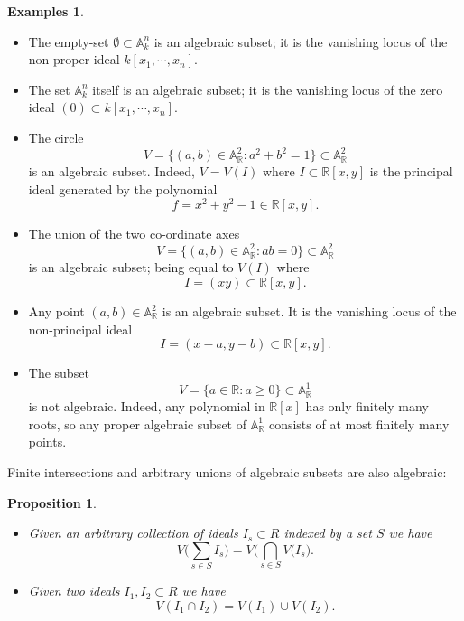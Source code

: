 \documentclass [12pt,oneside,a4paper,mathscr]{amsart}
\newtheorem{prop}[thm]{Proposition}
\theoremstyle{definition}
\newtheorem{examples}[thm]{Examples}
\newcommand {\A}{\mathbb A}
\renewcommand{\geq}{\geqslant}
\newcommand{\R}{\mathbb{R}}
\begin{document}
\begin{examples}
\label{eg_algset}
\begin{itemize}
\item[(a)] The empty-set $\emptyset\subset \A^n_k$ is an algebraic subset; it is the vanishing locus of the non-proper ideal $k[x_1,\cdots,x_n]$.\smallskip

\item[(b)]  The set $\A^n_k$ itself is an algebraic subset; it is the vanishing locus of the zero ideal $(0)\subset k[x_1,\cdots,x_n]$.
\smallskip
\item[(b)] The circle \[V=\{(a,b)\in \A^2_\R:a^2+b^2=1\}\subset \A^2_\R\] is an algebraic subset. Indeed, $V=V(I)$ where $I\subset \R[x,y]$ is the principal ideal generated by the polynomial \[f=x^2+y^2-1\in \R[x,y].\]
\item[(c)] The union of the two co-ordinate axes
\[V=\{(a,b)\in \A^2_\R:ab=0\}\subset \A^2_\R\] is an algebraic subset; being equal to $V(I)$ where \[I=(xy)\subset \R[x,y].\]
\item[(d)] Any  point $(a,b)\in \A^2_\R$ is an algebraic subset. It is the vanishing locus of the non-principal ideal \[I=(x-a,y-b)\subset \R[x,y].\]
\item[(e)] The subset \[V=\{a\in \R: a\geq 0\}\subset \A^1_\R\] is not algebraic. Indeed, any polynomial in $\R[x]$ has only finitely many roots, so any proper algebraic subset of $\A^1_\R$ consists of at most finitely many points.
\end{itemize}
\end{examples}

Finite intersections and arbitrary unions of algebraic subsets are also algebraic:

\begin{prop}
\label{zar}
\begin{itemize}
\item[(a)] Given an arbitrary collection of ideals $I_s\subset R$ indexed by a set $S$ we have
\[V\big(\sum_{s\in S} I_s\big)=V(\bigcap_{s\in S} V\big(I_s\big).\]

\item[(b)]Given two ideals $I_1,I_2\subset R$ we have
\[V(I_1\cap I_2)= V(I_1) \cup V(I_2).\]

\end{itemize}
\end{prop}
\end{document}
